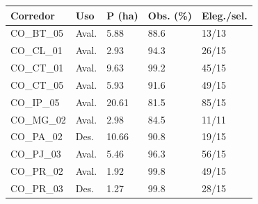 \begin{tabular}{lllll}
\hline
Corredor & Uso & P (ha) & Obs. (\%) & Eleg./sel. \\
\hline
CO\_BT\_05 & Aval. & 5.88 & 88.6 & 13/13 \\
CO\_CL\_01 & Aval. & 2.93 & 94.3 & 26/15 \\
CO\_CT\_01 & Aval. & 9.63 & 99.2 & 45/15 \\
CO\_CT\_05 & Aval. & 5.93 & 91.6 & 49/15 \\
CO\_IP\_05 & Aval. & 20.61 & 81.5 & 85/15 \\
CO\_MG\_02 & Aval. & 2.98 & 84.5 & 11/11 \\
CO\_PA\_02 & Des. & 10.66 & 90.8 & 19/15 \\
CO\_PJ\_03 & Aval. & 5.46 & 96.3 & 56/15 \\
CO\_PR\_02 & Aval. & 1.92 & 99.8 & 49/15 \\
CO\_PR\_03 & Des. & 1.27 & 99.8 & 28/15 \\
\hline
\end{tabular}
